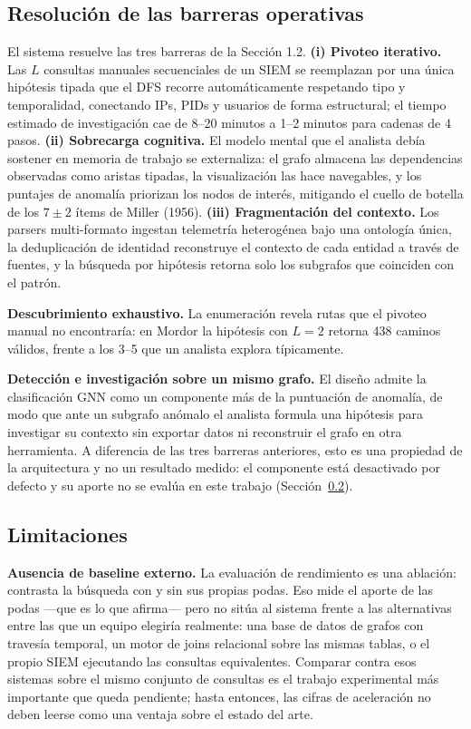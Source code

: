 \documentclass[11pt,a4paper]{article}
\begin{document}
\subsection{Resolución de las barreras operativas}
El sistema resuelve las tres barreras de la Sección 1.2. \textbf{(i) Pivoteo
iterativo.} Las $L$ consultas manuales secuenciales de un SIEM se reemplazan
por una única hipótesis tipada que el DFS recorre automáticamente respetando
tipo y temporalidad, conectando IPs, PIDs y usuarios de forma estructural; el
tiempo estimado de investigación cae de 8--20 minutos a 1--2 minutos para
cadenas de 4 pasos.
\textbf{(ii) Sobrecarga cognitiva.} El modelo mental que el analista debía
sostener en memoria de trabajo se externaliza: el grafo almacena las dependencias
observadas como aristas tipadas, la visualización las hace navegables, y los
puntajes de anomalía priorizan los nodos de interés, mitigando el cuello de
botella de los $7 \pm 2$ ítems de Miller (1956). \textbf{(iii) Fragmentación
del contexto.} Los parsers multi-formato ingestan telemetría heterogénea bajo
una ontología única, la deduplicación de identidad reconstruye el contexto de
cada entidad a través de fuentes, y la búsqueda por hipótesis retorna solo los
subgrafos que coinciden con el patrón.

\textbf{Descubrimiento exhaustivo.} La enumeración revela rutas que el pivoteo
manual no encontraría: en Mordor la hipótesis con $L = 2$ retorna 438 caminos
válidos, frente a los 3--5 que un analista explora típicamente.

\textbf{Detección e investigación sobre un mismo grafo.} El diseño admite la
clasificación GNN como un componente más de la puntuación de anomalía, de modo
que ante un subgrafo anómalo el analista formula una hipótesis para investigar
su contexto sin exportar datos ni reconstruir el grafo en otra herramienta. A
diferencia de las tres barreras anteriores, esto es una propiedad de la
arquitectura y no un resultado medido: el componente está desactivado por
defecto y su aporte no se evalúa en este trabajo
(Sección~\ref{sec:limitaciones}).

\subsection{Limitaciones}
\label{sec:limitaciones}
\textbf{Ausencia de baseline externo.} La evaluación de rendimiento es una
ablación: contrasta la búsqueda con y sin sus propias podas. Eso mide el aporte
de las podas ---que es lo que afirma--- pero no sitúa al sistema frente a las
alternativas entre las que un equipo elegiría realmente: una base de datos de
grafos con travesía temporal, un motor de joins relacional sobre las mismas
tablas, o el propio SIEM ejecutando las consultas equivalentes. Comparar contra
esos sistemas sobre el mismo conjunto de consultas es el trabajo experimental
más importante que queda pendiente; hasta entonces, las cifras de aceleración
no deben leerse como una ventaja sobre el estado del arte.
\end{document}
